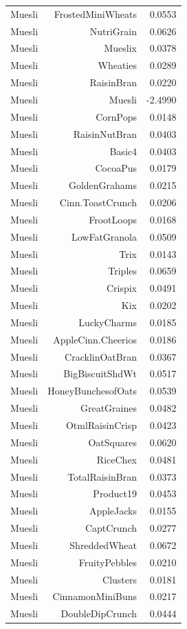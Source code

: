 \begin{longtable}{@{}lrr@{}}
Muesli & FrostedMiniWheats & 0.0553 \\
Muesli & NutriGrain & 0.0626 \\
Muesli & Mueslix & 0.0378 \\
Muesli & Wheaties & 0.0289 \\
Muesli & RaisinBran & 0.0220 \\
Muesli & Muesli & -2.4990 \\
Muesli & CornPops & 0.0148 \\
Muesli & RaisinNutBran & 0.0403 \\
Muesli & Basic4 & 0.0403 \\
Muesli & CocoaPus & 0.0179 \\
Muesli & GoldenGrahams & 0.0215 \\
Muesli & Cinn.ToastCrunch & 0.0206 \\
Muesli & FrootLoops & 0.0168 \\
Muesli & LowFatGranola & 0.0509 \\
Muesli & Trix & 0.0143 \\
Muesli & Triples & 0.0659 \\
Muesli & Crispix & 0.0491 \\
Muesli & Kix & 0.0202 \\
Muesli & LuckyCharms & 0.0185 \\
Muesli & AppleCinn.Cheerios & 0.0186 \\
Muesli & CracklinOatBran & 0.0367 \\
Muesli & BigBiscuitShdWt & 0.0517 \\
Muesli & HoneyBunchesofOats & 0.0539 \\
Muesli & GreatGraines & 0.0482 \\
Muesli & OtmlRaisinCrisp & 0.0423 \\
Muesli & OatSquares & 0.0620 \\
Muesli & RiceChex & 0.0481 \\
Muesli & TotalRaisinBran & 0.0373 \\
Muesli & Product19 & 0.0453 \\
Muesli & AppleJacks & 0.0155 \\
Muesli & CaptCrunch & 0.0277 \\
Muesli & ShreddedWheat & 0.0672 \\
Muesli & FruityPebbles & 0.0210 \\
Muesli & Clusters & 0.0181 \\
Muesli & CinnamonMiniBuns & 0.0217 \\
Muesli & DoubleDipCrunch & 0.0444 \\

\end{longtable}
